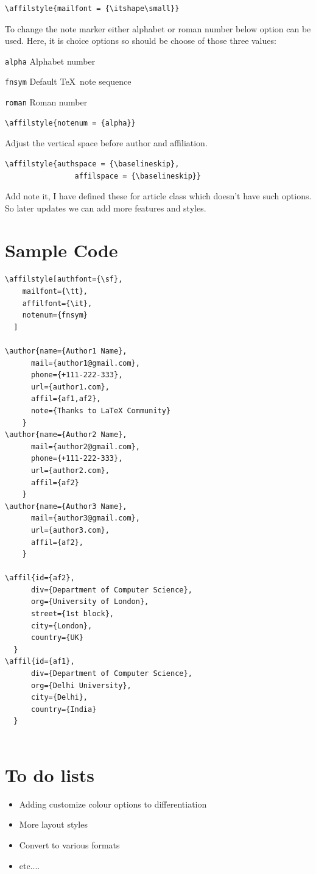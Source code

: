 \documentclass{article}
\begin{document}
\begin{lstlisting}[style=mystyle]
  \affilstyle{mailfont = {\itshape\small}}
\end{lstlisting}

To change the note marker either alphabet or roman number below option can be used.
Here, it is choice options so should be choose of those three values:

\medskip

{\tt alpha} Alphabet number

{\tt fnsym} Default \TeX\ note sequence

{\tt roman} Roman number

\begin{lstlisting}[style=mystyle]
  \affilstyle{notenum = {alpha}}
\end{lstlisting}

\medskip

Adjust the vertical space before author and affiliation.

\begin{lstlisting}[style=mystyle]
\affilstyle{authspace = {\baselineskip},    
                affilspace = {\baselineskip}}
\end{lstlisting}

\bigskip

Add note it, I have defined these for article class which doesn't have such options. So later updates we can add more features and styles.

\section*{Sample Code}

\begin{lstlisting}[style=mystyle]
\affilstyle[authfont={\sf},
    mailfont={\tt},
    affilfont={\it},    
    notenum={fnsym}
  ]
  
\author{name={Author1 Name},
      mail={author1@gmail.com},
      phone={+111-222-333},
      url={author1.com},    
      affil={af1,af2},
      note={Thanks to LaTeX Community}    
    }  
\author{name={Author2 Name},
      mail={author2@gmail.com},
      phone={+111-222-333},
      url={author2.com},    
      affil={af2}
    }  
\author{name={Author3 Name},
      mail={author3@gmail.com},
      url={author3.com},    
      affil={af2},
    }
  
\affil{id={af2},
      div={Department of Computer Science},
      org={University of London},    
      street={1st block},
      city={London},
      country={UK}    
  }
\affil{id={af1},
      div={Department of Computer Science},
      org={Delhi University},    
      city={Delhi},
      country={India}   
  }
   
\end{lstlisting}


\section*{To do lists}

\begin{itemize}
  \item Adding customize colour options to differentiation
  \item More layout styles
  \item Convert to various formats
  \item etc....
\end{itemize}

\printindex
\end{document}
